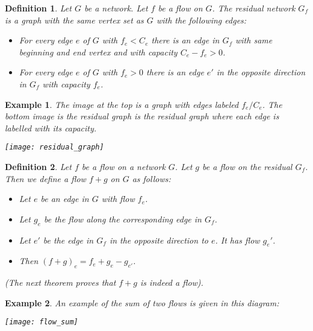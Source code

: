 \documentclass[12pt]{article}
\newtheorem{Definition}{Definition}
\newtheorem{Example}{Example}
\begin{document}
\begin{Definition}
    Let $G$ be a network. Let $f$ be a flow on $G$. The \emph{residual network}  $G_f$ is a graph with the same vertex set as $G$ with the following edges:
    \begin{itemize}
        \item For every edge $e$ of $G$ with $f_e < C_e$ there is an edge in $G_f$ with same beginning and end vertex and with capacity $C_e-f_e>0 $.
        \item For every edge $e$ of $G$ with $f_e>0$ there is an edge $e'$ in the opposite direction in $G_f$ with capacity $f_e$.
    \end{itemize}
\end{Definition}

\begin{Example}
    The image at the top is a graph with edges labeled $f_e / C_e$. The bottom image is the residual graph is the residual graph where each edge is labelled with its capacity.
    \begin{center}
        \texttt{[image: residual\_graph]}
    \end{center}
\end{Example}

\begin{Definition}
    Let $f$ be a flow on a network $G$. Let $g$ be a flow on the residual $G_f$. Then we define a flow $f+g$ on $G$ as follows:
    \begin{itemize}
        \item Let $e$ be an edge in $G$ with flow $f_e$.
        \item Let $g_e$ be the flow along the corresponding edge in $G_f$.
        \item Let $e'$ be the edge in $G_f$ in the opposite direction to $e$. It has flow $g_e'$.
        \item Then $(f+g)_e = f_e + g_e - g_{e'}$.
    \end{itemize}
    (The next theorem proves that $f+g$ is indeed a flow).
\end{Definition}

\begin{Example}
    An example of the sum of two flows is given in this diagram:
    \begin{center}
        \texttt{[image: flow\_sum]}
    \end{center}
\end{Example}
\end{document}
